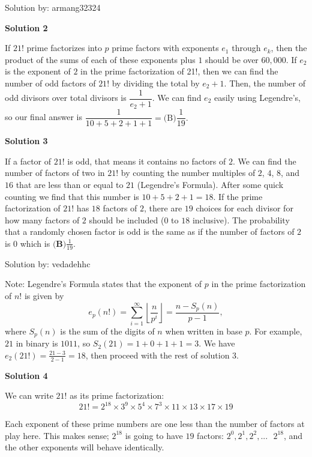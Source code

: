 \begin{enumerate}
 Solution by: armang32324

 



\textbf{Solution 2}

If $21!$ prime factorizes into $p$ prime factors with exponents $e_1$ through $e_k$, then the product of the sums of each of these exponents plus $1$ should be over $60,000$. If $e_2$ is the exponent of $2$ in the prime factorization of 21!, then we can find the number of odd factors of $21!$ by dividing the total by $e_2+1$. Then, the number of odd divisors over total divisors is $\dfrac{1}{e_2+1}$. We can find $e_2$ easily using Legendre's, so our final answer is $\dfrac{1}{10 + 5 + 2 + 1+1} = \boxed{\text{(B)} \dfrac{1}{19}}.$




\textbf{Solution 3}

If a factor of $21!$ is odd, that means it contains no factors of $2$. We can find the number of factors of two in $21!$ by counting the number multiples of $2$, $4$, $8$, and $16$ that are less than or equal to $21$ (Legendre's Formula). After some quick counting we find that this number is $10+5+2+1 = 18$. If the prime factorization of $21!$ has $18$ factors of $2$, there are $19$ choices for each divisor for how many factors of $2$ should be included ($0$ to $18$ inclusive). The probability that a randomly chosen factor is odd is the same as if the number of factors of $2$ is $0$ which is     $\boxed{\textbf{(B)}\frac{1}{19}}$.

 Solution by: vedadehhc

 Note: Legendre's Formula states that the exponent of $p$ in the prime factorization of $n!$ is given by
 \[e_p(n!)=\sum_{i=1}^{\infty}\left\lfloor\frac{n}{p^i}\right\rfloor=\frac{n-S_p(n)}{p-1},\]where $S_p(n)$ is the sum of the digits of $n$ when written in base $p$. For example, $21$ in binary is $1011$, so $S_2(21)=1+0+1+1=3$. We have $e_2(21!)=\frac{21-3}{2-1}=18$, then proceed with the rest of solution 3.

 



\textbf{Solution 4}

We can write $21!$ as its prime factorization:
 \[21!=2^{18}\times3^9\times5^4\times7^3\times11\times13\times17\times19\]

 Each exponent of these prime numbers are one less than the number of factors at play here. This makes sense; $2^{18}$ is going to have $19$ factors: $2^0, 2^1, 2^2,...\text{ }2^{18}$, and the other exponents will behave identically. 


\end{enumerate}
